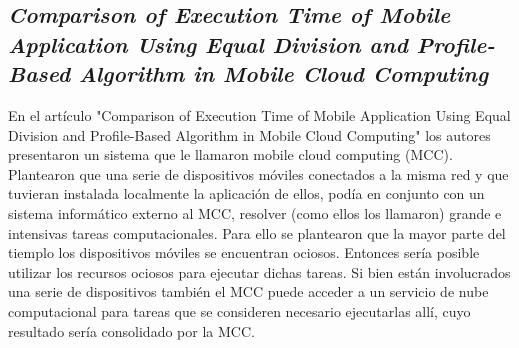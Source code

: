 \subsection{
    \textbf{\emph{Comparison of Execution Time of Mobile
            Application Using Equal Division
            and Profile-Based Algorithm in Mobile
            Cloud Computing}
    }
}

En el artículo "Comparison of Execution Time of Mobile
Application Using Equal Division
and Profile-Based Algorithm in Mobile
Cloud Computing"\cite[pág. 59]{chaudharyMicroservices2020} los autores presentaron un sistema que le llamaron mobile cloud computing (MCC).
Plantearon que una serie de dispositivos móviles conectados a la misma red y que tuvieran instalada localmente la aplicación de ellos, podía en conjunto con un sistema informático externo al MCC, resolver (como ellos los llamaron) grande e intensivas tareas computacionales. Para ello se plantearon que la mayor parte del tiemplo los dispositivos móviles se encuentran ociosos. Entonces sería posible utilizar los recursos ociosos para ejecutar dichas tareas. Si bien están involucrados una serie de dispositivos también el MCC puede acceder a un servicio de nube computacional para tareas que se consideren necesario ejecutarlas allí, cuyo resultado sería consolidado por la MCC.\par

